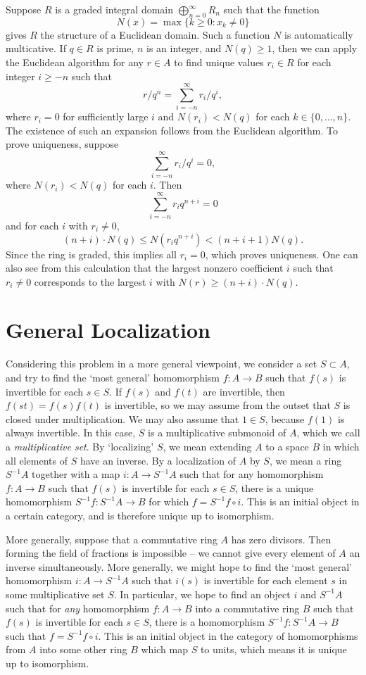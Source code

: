 Suppose $R$ is a graded integral domain $\bigoplus_{n = 0}^\infty R_n$ such that the function
%
\[ N(x) = \max \{ k \geq 0 : x_k \neq 0 \} \]
%
gives $R$ the structure of a Euclidean domain. Such a function $N$ is automatically multicative. If $q \in R$ is prime, $n$ is an integer, and $N(q) \geq 1$, then we can apply the Euclidean algorithm for any $r \in A$ to find unique values $r_i \in R$ for each integer $i \geq -n$ such that
%
\[ r/q^n = \sum_{i = -n}^\infty r_i / q^i, \]
%
where $r_i = 0$ for sufficiently large $i$ and $N(r_i) < N(q)$ for each $k \in \{ 0, \dots, n \}$. The existence of such an expansion follows from the Euclidean algorithm. To prove uniqueness, suppose
%
\[ \sum_{i = -n}^\infty r_i/q^i = 0, \]
%
where $N(r_i) < N(q)$ for each $i$. Then
%
\[ \sum_{i = -n}^\infty r_i q^{n+i} = 0 \]
%
and for each $i$ with $r_i \neq 0$,
%
\[ (n+i) \cdot N(q) \leq N(r_i q^{n+i}) < (n+i+1) N(q). \]
%
Since the ring is graded, this implies all $r_i = 0$, which proves uniqueness. One can also see from this calculation that the largest nonzero coefficient $i$ such that $r_i \neq 0$ corresponds to the largest $i$ with $N(r) \geq (n+i) \cdot N(q)$.

\section{General Localization}

Considering this problem in a more general viewpoint, we consider a set $S \subset A$, and try to find the `most general' homomorphism $f: A \to B$ such that $f(s)$ is invertible for each $s \in S$. If $f(s)$ and $f(t)$ are invertible, then $f(st) = f(s)f(t)$ is invertible, so we may assume from the outset that $S$ is closed under multiplication. We may also assume that $1 \in S$, because $f(1)$ is always invertible. In this case, $S$ is a multiplicative submonoid of $A$, which we call a \emph{multiplicative set}. By `localizing' $S$, we mean extending $A$ to a space $B$ in which all elements of $S$ have an inverse. By a localization of $A$ by $S$, we mean a ring $S^{-1}A$ together with a map $i: A \to S^{-1}A$ such that for any homomorphism $f:A \to B$ such that $f(s)$ is invertible for each $s \in S$, there is a unique homomorphism $S^{-1}f: S^{-1}A \to B$ for which $f = S^{-1}f \circ i$. This is an initial object in a certain category, and is therefore unique up to isomorphism.

More generally, suppose that a commutative ring $A$ has zero divisors. Then forming the field of fractions is impossible -- we cannot give every element of $A$ an inverse simultaneously. More generally, we might hope to find the `most general' homomorphism $i: A \to S^{-1}A$ such that $i(s)$ is invertible for each element $s$ in some multiplicative set $S$. In particular, we hope to find an object $i$ and $S^{-1}A$ such that for {\it any} homomorphism $f: A \to B$ into a commutative ring $B$ such that $f(s)$ is invertible for each $s \in S$, there is a homomorphism $S^{-1}f: S^{-1}A \to B$ such that $f = S^{-1}f \circ i$. This is an initial object in the category of homomorphisms from $A$ into some other ring $B$ which map $S$ to units, which means it is unique up to isomorphism.

